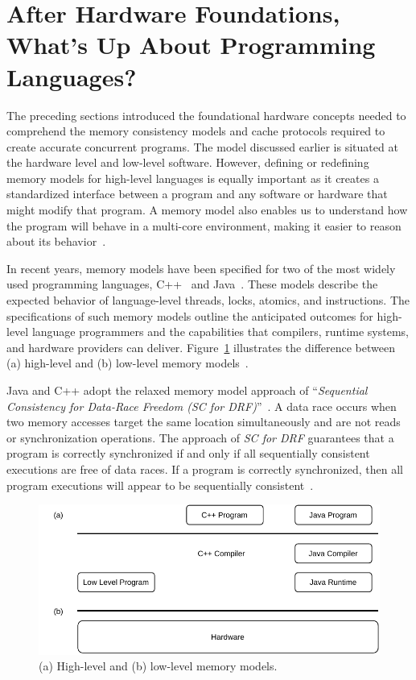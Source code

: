 \section{After Hardware Foundations, What's Up About Programming Languages?}

The preceding sections introduced the foundational hardware concepts needed to comprehend the memory consistency models and cache protocols required to create accurate concurrent programs. The model discussed earlier is situated at the hardware level and low-level software. However, defining or redefining memory models for high-level languages is equally important as it creates a standardized interface between a program and any software or hardware that might modify that program. A memory model also enables us to understand how the program will behave in a multi-core environment, making it easier to reason about its behavior~\cite{DBLP_journals_cacm_AdveB10, DBLP_series_synthesis_2020Nagarajan}.

In recent years, memory models have been specified for two of the most widely used programming languages, C++~\cite{DBLP_conf_pldi_BoehmA08} and Java~\cite{DBLP_conf_popl_MansonPA05}. These models describe the expected behavior of language-level threads, locks, atomics, and \RMW{} instructions. The specifications of such memory models outline the anticipated outcomes for high-level language programmers and the capabilities that compilers, runtime systems, and hardware providers can deliver. Figure~\ref{fig:memory-models} illustrates the difference between (a) high-level and (b) low-level memory models~\cite{DBLP_series_synthesis_2020Nagarajan}.

Java and C++ adopt the relaxed memory model approach of ``\emph{Sequential Consistency for Data-Race Freedom (SC for DRF)}''~\cite{DBLP_conf_isca_AdveH90}.  A data race occurs when two memory accesses target the same location simultaneously and are not reads or synchronization operations. The approach of \emph{SC for DRF} guarantees that a program is correctly synchronized if and only if all sequentially consistent executions are free of data races. If a program is correctly synchronized, then all program executions will appear to be sequentially consistent~\cite{javamemorymodelspec}.

\begin{figure}[ht!]
    \centering
    \includegraphics[width=0.9\linewidth]{contents//figures/III_3_memory_model.pdf}
    \caption{(a) High-level and (b) low-level memory models.}
    \label{fig:memory-models}
\end{figure}

